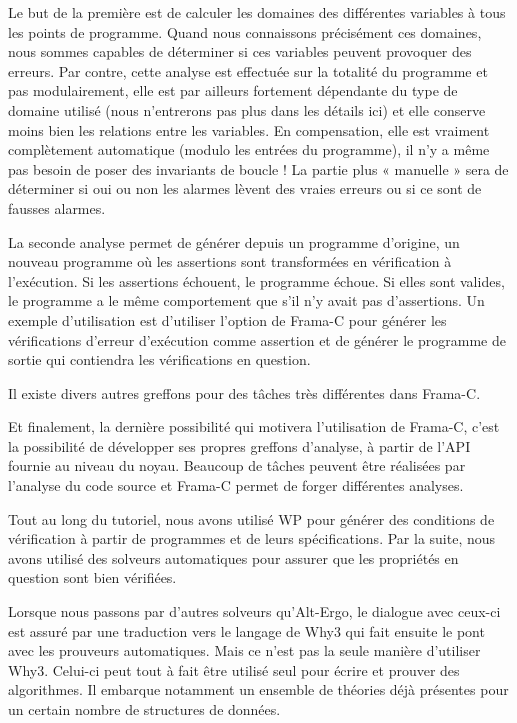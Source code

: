 Le but de la première est de calculer les domaines des différentes variables à
tous les points de programme. Quand nous connaissons précisément ces domaines,
nous sommes capables de déterminer si ces variables peuvent provoquer des erreurs.
Par contre, cette analyse est effectuée sur la totalité du programme et pas
modulairement, elle est par ailleurs fortement dépendante du type de domaine
utilisé (nous n'entrerons pas plus dans les détails ici) et elle conserve moins
bien les relations entre les variables. En compensation, elle est vraiment
complètement automatique (modulo les entrées du programme), il n'y a même pas
besoin de poser des invariants de boucle ! La partie plus « manuelle » sera de
déterminer si oui ou non les alarmes lèvent des vraies erreurs ou si ce sont de
fausses alarmes.



La seconde analyse permet de générer depuis un programme d'origine, un nouveau
programme où les assertions sont transformées en vérification à l'exécution. Si
les assertions échouent, le programme échoue. Si elles sont valides, le programme
a le même comportement que s'il n'y avait pas d'assertions. Un exemple
d'utilisation est d'utiliser l'option  de Frama-C pour générer les
vérifications d'erreur d'exécution comme assertion et de générer le programme de
sortie qui contiendra les vérifications en question.



Il existe divers autres greffons pour des tâches très différentes dans Frama-C.


Et finalement, la dernière possibilité qui motivera l'utilisation de Frama-C,
c'est la possibilité de développer ses propres greffons d'analyse, à partir de
l'API fournie au niveau du noyau. Beaucoup de tâches peuvent être réalisées par
l'analyse du code source et Frama-C permet de forger différentes analyses.





Tout au long du tutoriel, nous avons utilisé WP pour générer des conditions de
vérification à partir de programmes et de leurs spécifications. Par la suite,
nous avons utilisé des solveurs automatiques pour assurer que les propriétés en
question sont bien vérifiées.



Lorsque nous passons par d'autres solveurs qu'Alt-Ergo, le dialogue avec ceux-ci
est assuré par une traduction vers le langage de Why3 qui fait ensuite le pont
avec les prouveurs automatiques. Mais ce n'est pas la seule manière d'utiliser
Why3. Celui-ci peut tout à fait être utilisé seul pour écrire et prouver des
algorithmes. Il embarque notamment un ensemble de théories déjà présentes pour un
certain nombre de structures de données.



